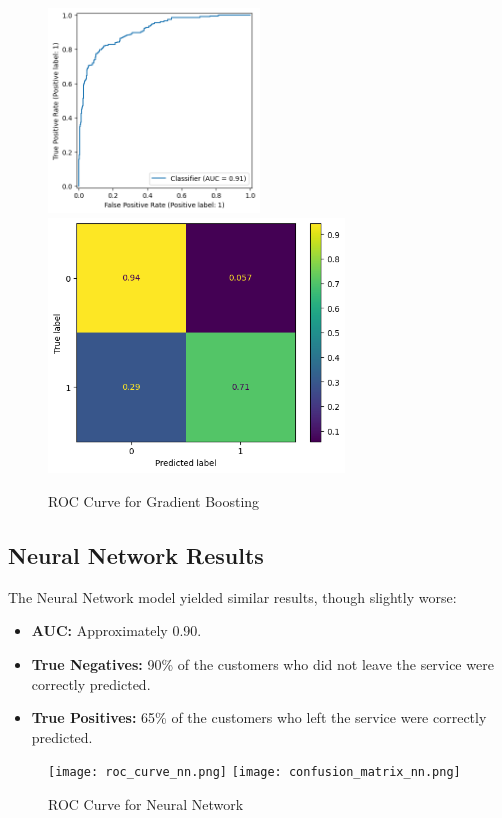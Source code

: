 \documentclass[12pt]{article}
\begin{document}
\begin{figure}[h!]
    \centering
    \includegraphics[width=0.5\textwidth]{Figures/roc_curve_gb.png}
    \includegraphics[width=0.7\textwidth]{Figures/confusion_matrix_gb.png}
    \caption{ROC Curve for Gradient Boosting}
    \label{fig:roc_curve_gb}
\end{figure}


\subsection{Neural Network Results}
The Neural Network model yielded similar results, though slightly worse:
\begin{itemize}
    \item \textbf{AUC:} Approximately 0.90.
    \item \textbf{True Negatives:} 90\% of the customers who did not leave the service were correctly predicted.
    \item \textbf{True Positives:} 65\% of the customers who left the service were correctly predicted.
\end{itemize}

\begin{figure}[h!]
    \centering
    \texttt{[image: roc\_curve\_nn.png]}
    \texttt{[image: confusion\_matrix\_nn.png]}
    \caption{ROC Curve for Neural Network}
    \label{fig:roc_curve_nn}
\end{figure}
\end{document}

